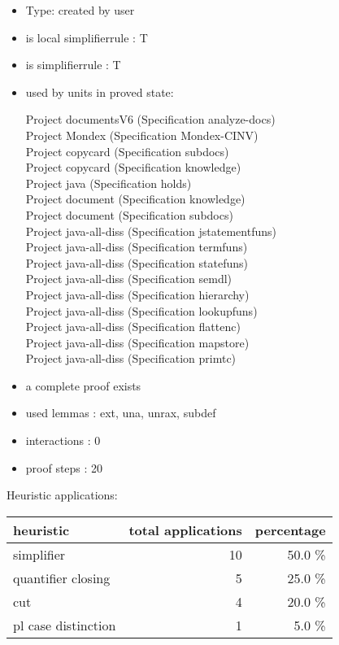 \documentclass[a4paper]{article}
\begin{document}
\begin{itemize}

\item Type: created by user

\item is local simplifierrule : T
\item is simplifierrule : T
\item used by units in proved state:

Project documentsV6 (Specification analyze-docs) \\
Project Mondex (Specification Mondex-CINV) \\
Project copycard (Specification subdocs) \\
Project copycard (Specification knowledge) \\
Project java (Specification holds) \\
Project document (Specification knowledge) \\
Project document (Specification subdocs) \\
Project java-all-diss (Specification jstatementfuns) \\
Project java-all-diss (Specification termfuns) \\
Project java-all-diss (Specification statefuns) \\
Project java-all-diss (Specification semdl) \\
Project java-all-diss (Specification hierarchy) \\
Project java-all-diss (Specification lookupfuns) \\
Project java-all-diss (Specification flattenc) \\
Project java-all-diss (Specification mapstore) \\
Project java-all-diss (Specification primtc)
\item       a complete proof exists
\item       used lemmas  : ext, una, unrax, subdef
\item       interactions : 0
\item       proof steps  : 20
\end{itemize}

\medskip


Heuristic applications:

\begin{supertabular}{l|r|r}
heuristic	& total applications & percentage \\ \hline
simplifier & 10 & 50.0 \% \\
quantifier closing & 5 & 25.0 \% \\
cut & 4 & 20.0 \% \\
pl case distinction & 1 & 5.0 \% \\

\end{supertabular}
\end{document}
